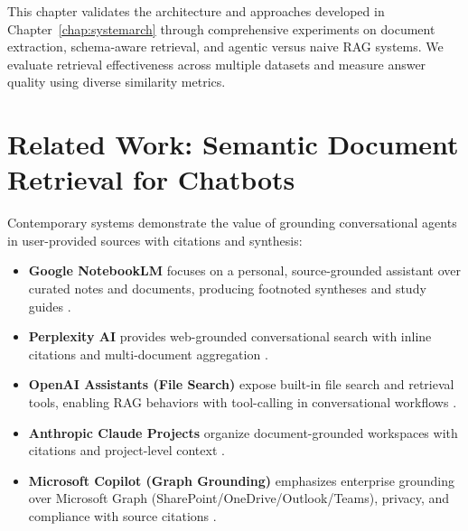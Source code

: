 \label{chap:results}

This chapter validates the architecture and approaches developed in Chapter~\ref{chap:systemarch} through comprehensive experiments on document extraction, schema-aware retrieval, and agentic versus naive \gls{RAG} systems. We evaluate retrieval effectiveness across multiple datasets and measure answer quality using diverse similarity metrics.

\section{Related Work: Semantic Document Retrieval for Chatbots}
Contemporary systems demonstrate the value of grounding conversational agents in user-provided sources with citations and synthesis:
\begin{itemize}
    \item \textbf{Google NotebookLM} focuses on a personal, source-grounded assistant over curated notes and documents, producing footnoted syntheses and study guides \cite{notebooklm}.
    \item \textbf{Perplexity AI} provides web-grounded conversational search with inline citations and multi-document aggregation \cite{perplexity}.
    \item \textbf{OpenAI Assistants (File Search)} expose built-in file search and retrieval tools, enabling RAG behaviors with tool-calling in conversational workflows \cite{openai-assistants-file-search}.
    \item \textbf{Anthropic Claude Projects} organize document-grounded workspaces with citations and project-level context \cite{anthropic-projects}.
    \item \textbf{Microsoft Copilot (Graph Grounding)} emphasizes enterprise grounding over Microsoft Graph (SharePoint/OneDrive/Outlook/Teams), privacy, and compliance with source citations \cite{ms-copilot-graph}.
\end{itemize}

